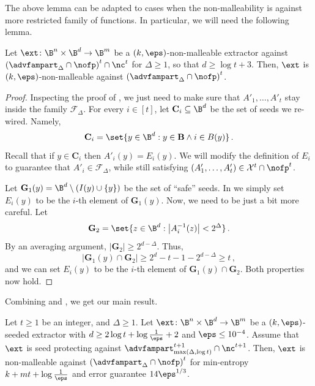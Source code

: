 %
%
%

The above lemma can be adapted to cases when the non-malleability is against
more restricted family of functions. In particular, we will need the following lemma.
\begin{lemma}\label{lem:nm-with-coll22} 
Let $\ext \colon \B^{n} \times \B^{d} \rightarrow \B^{m}$ be a $(k,\eps)$-non-malleable
extractor against $\left(\advfampart_{\Delta} \cap \nofp\right)^t \cap \nc^t$ for $\Delta  \ge 1$, so that $d \ge \log {t} + 3$. Then, $\ext$ is $(k,\eps)$-non-malleable
against $\left(\advfampart_{\Delta} \cap \nofp\right)^t$.
\end{lemma}
\begin{proof}
Inspecting the proof of , we just need to make sure that
$A'_{1},\ldots,A'_{t}$ stay inside the family $\mathcal{F}_{\Delta}$. For every $i \in [t]$, let
$\mathbf{C}_i \subseteq \B^d$ be the set of seeds we re-wired. Namely,
\[
\mathbf{C}_i = \set{y \in \B^d : y \in \mathbf{B} \wedge i \in B(y)}\,.
\]
Recall that if $y \in \mathbf{C}_i$ then $A'_{i}(y) = E_{i}(y)$. We will modify the definition of 
$E_{i}$ to guarantee that $A'_i \in \mathcal{F}_{\Delta}$, while still satisfying
$(A'_1,\ldots,A'_t) \in \mathcal{X}^t \cap \nofp^t$.%

Let $\mathbf{G}_1(y) = \B^{d} \setminus (I(y) \cup \{y\})$ be the set of ``safe'' seeds. In 
we simply set $E_{i}(y)$ to be the $i$-th element of $\mathbf{G}_1(y)$. Now, we need to be just a bit
more careful. Let
\[
\mathbf{G}_2 = \set{z \in \B^d: \left| A_{i}^{-1}(z) \right| < 2^{\Delta}}\,.
\]
By an averaging argument, $|\mathbf{G}_2| \ge 2^{d-\Delta}$. Thus, 
\[
\left|\mathbf{G}_1(y) \cap \mathbf{G}_2\right| \ge 2^d - t - 1 - 2^{d-\Delta} \ge t\,,
\]
and we can set $E_{i}(y)$ to be the $i$-th element of $\mathbf{G}_1(y) \cap \mathbf{G}_2$.
Both properties now hold.
\end{proof}
%
%
%
%
%
%
%
%
%
%

Combining  and , we get our main result.

\begin{corollary}\label{main:sec2}
Let $t \ge 1$ be an integer, and $\Delta \ge 1$.
Let $\ext\colon\B^{n}\times\B^{d}\rightarrow\B^m$ be a $(k,\eps)$-seeded extractor with $d \ge 2\log{t} + \log\frac1{\eps} + 2$ and $\eps \leq 10^{-4}$. Assume that $\ext$ is seed protecting against $\advfampart^{t+1}_{\max(\Delta, \log t)} \cap \nc^{t+1}$. Then, $\ext$ is non-malleable against $\left(\advfampart_{\Delta} \cap \nofp\right)^t$  for min-entropy $k+mt+\log\frac1{\eps}$ and error guarantee $14 \eps^{1/3}$.
\end{corollary}


